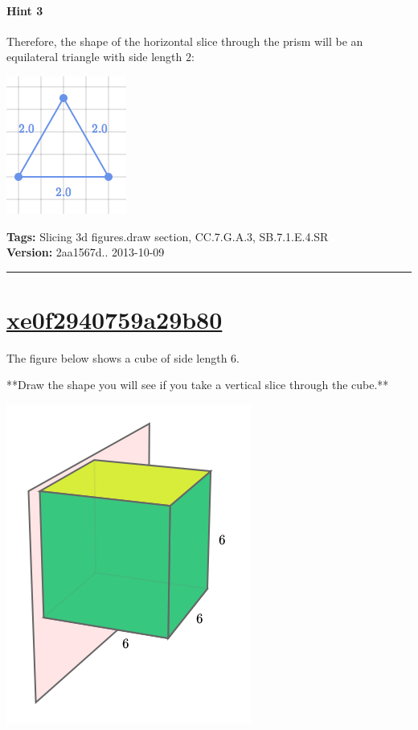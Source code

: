 \documentclass[twocolumn,10pt]{article}
\def\shrinkfactor{0.4}
\begin{document}
\paragraph{Hint 3}Therefore, the shape of the horizontal slice through the prism will be an equilateral triangle with side length $2$:  

\includegraphics[scale=\shrinkfactor]{figures/f8d6ecceeaa6abcdead884e4f8edd48e735a5e80.png}



\medskip
\noindent
\textbf{Tags:} {\footnotesize Slicing 3d figures.draw section, CC.7.G.A.3, SB.7.1.E.4.SR}\\
\textbf{Version:} 2aa1567d.. 2013-10-09
\smallskip\hrule





\section{\href{https://www.khanacademy.org/devadmin/content/items/xe0f2940759a29b80}{xe0f2940759a29b80}}

\noindent
The figure below shows a cube of side length $6$.   

**Draw the shape you will see if you take a vertical slice through the cube.**


\includegraphics[scale=\shrinkfactor]{figures/294f9514eb8ff76c2ef01fa15cac104d58e65bc8.png}
\end{document}
